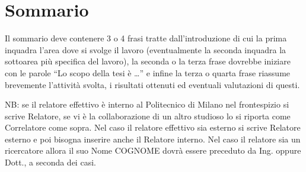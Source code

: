 \newpage
\chapter*{Sommario}


Il sommario deve contenere 3 o 4 frasi tratte dall'introduzione di cui la prima inquadra l'area dove si svolge il lavoro (eventualmente la seconda inquadra la sottoarea pi\`u specifica del lavoro), la seconda o la terza frase dovrebbe iniziare con le parole ``Lo scopo della tesi \`e \dots'' e infine la terza o quarta frase riassume brevemente l'attivit\`a  svolta, i risultati ottenuti ed eventuali valutazioni di questi.

\vspace{0.5cm}
\noindent NB: se il relatore effettivo \`e interno al Politecnico di Milano nel frontespizio si scrive Relatore, se vi \`e la collaborazione di un altro studioso lo si riporta come Correlatore come sopra. Nel caso il relatore effettivo sia esterno si scrive Relatore esterno e poi bisogna inserire anche il Relatore interno. Nel caso il relatore sia un ricercatore allora il suo Nome COGNOME dovr\`a  essere preceduto da Ing. oppure Dott., a seconda dei casi.
